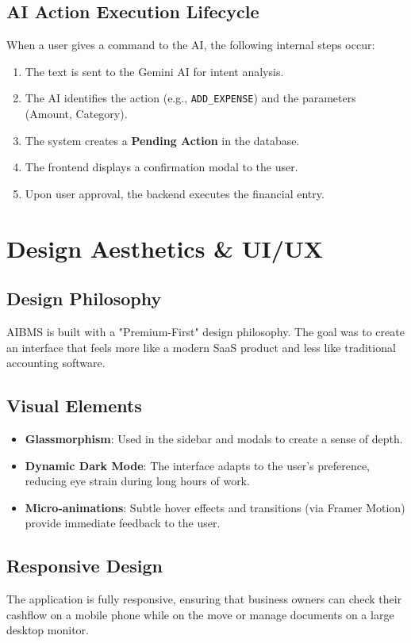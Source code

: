 \documentclass[12pt,a4paper]{report}
\begin{document}
\section{AI Action Execution Lifecycle}
When a user gives a command to the AI, the following internal steps occur:
\begin{enumerate}
    \item The text is sent to the Gemini AI for intent analysis.
    \item The AI identifies the action (e.g., \texttt{ADD\_EXPENSE}) and the parameters (Amount, Category).
    \item The system creates a \textbf{Pending Action} in the database.
    \item The frontend displays a confirmation modal to the user.
    \item Upon user approval, the backend executes the financial entry.
\end{enumerate}

\chapter{Design Aesthetics \& UI/UX}
\section{Design Philosophy}
AIBMS is built with a "Premium-First" design philosophy. The goal was to create an interface that feels more like a modern SaaS product and less like traditional accounting software.

\section{Visual Elements}
\begin{itemize}
    \item \textbf{Glassmorphism}: Used in the sidebar and modals to create a sense of depth.
    \item \textbf{Dynamic Dark Mode}: The interface adapts to the user's preference, reducing eye strain during long hours of work.
    \item \textbf{Micro-animations}: Subtle hover effects and transitions (via Framer Motion) provide immediate feedback to the user.
\end{itemize}

\section{Responsive Design}
The application is fully responsive, ensuring that business owners can check their cashflow on a mobile phone while on the move or manage documents on a large desktop monitor.
\end{document}
